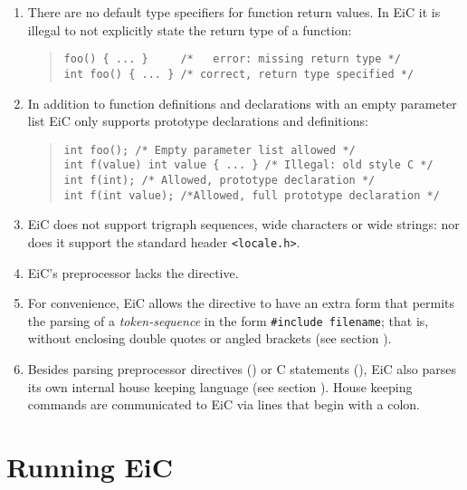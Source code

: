 \begin{enumerate}
\item  There are no default type specifiers for function return values. In EiC it is 
        illegal to not explicitly state the return type of a function:

\begin{quote}
\begin{verbatim}
foo() { ... }     /*   error: missing return type */
int foo() { ... } /* correct, return type specified */ 
\end{verbatim}
\end{quote}

\item  In addition to function definitions and declarations with 
an empty parameter list EiC only supports prototype declarations and
definitions:

\begin{quote}
\begin{verbatim}
int foo(); /* Empty parameter list allowed */ 
int f(value) int value { ... } /* Illegal: old style C */ 
int f(int); /* Allowed, prototype declaration */ 
int f(int value); /*Allowed, full prototype declaration */
\end{verbatim}
\end{quote}

\item EiC does not support trigraph sequences, wide characters or  
        wide strings: nor does it support the standard header
        \verb+<locale.h>+.

\item EiC's preprocessor lacks the  directive.

\item For convenience, EiC allows the  directive
        to have an extra form that permits the parsing of a {\it
        token-sequence} in the form \verb+#include filename+; that is,
        without enclosing double quotes or angled brackets (see
        section ).

\item Besides parsing preprocessor directives ()
or C statements (), EiC also parses its own
internal house keeping language (see section ).
House keeping commands are communicated to EiC via  lines that
begin with a colon.

\end{enumerate}

\section{Running EiC}
\label{sec:RunningEiC}

